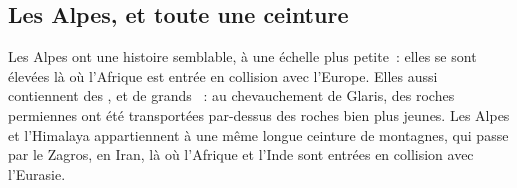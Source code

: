 \subsection{Les Alpes, et toute une ceinture}

Les Alpes ont une histoire semblable, à une échelle plus petite~: elles se
sont élevées là où l'Afrique est entrée en collision avec l'Europe. Elles
aussi contiennent des , et de grands ~: au
chevauchement de Glaris, des roches permiennes ont été transportées
par-dessus des roches bien plus jeunes. Les Alpes et l'Himalaya
appartiennent à une même longue ceinture de montagnes, qui passe par le
Zagros, en Iran, là où l'Afrique et l'Inde sont entrées en collision avec
l'Eurasie.

